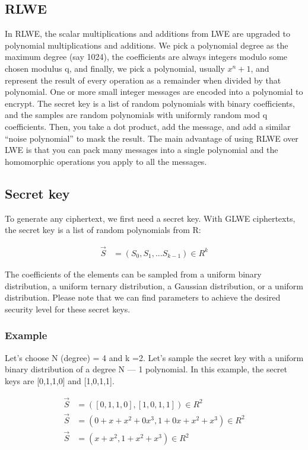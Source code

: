 \documentclass{techrep}
\theoremstyle{definition}
\theoremstyle{plain}
\begin{document}
\subsection{RLWE}
In RLWE, the scalar multiplications and additions from LWE are upgraded to polynomial multiplications and additions. We pick a polynomial degree as the maximum degree (say 1024), the coefficients are always integers modulo some chosen modulus q, and finally, we pick a polynomial, usually $x^n+1$, and represent the result of every operation as a remainder when divided by that polynomial. One or more small integer messages are encoded into a polynomial to encrypt. The secret key is a list of random polynomials with binary coefficients, and the samples are random polynomials with uniformly random mod q coefficients. Then, you take a dot product, add the message, and add a similar “noise polynomial” to mask the result. The main advantage of using RLWE over LWE is that you can pack many messages into a single polynomial and the homomorphic operations you apply to all the messages. 


	\subsection{Secret key}
To generate any ciphertext, we first need a secret key. With  GLWE ciphertexts, the secret key is a list of 
 random polynomials from R:

	\begin{align*}
		\overrightarrow{S} &= (S_0,S_1,...S_{k-1}) \in R^k
	\end{align*}

The coefficients of the elements can be sampled from a uniform binary distribution, a uniform ternary distribution, a Gaussian distribution, or a uniform distribution. Please note that we can find parameters to achieve the desired security level for these secret keys.

\subsubsection{Example}

Let’s choose N (degree) = 4 and k =2. Let's sample the secret key with a uniform binary distribution of a degree N — 1 polynomial. In this example, the secret keys are [0,1,1,0] and [1,0,1,1].

\begin{align*} 
\overrightarrow{S} &= ([0,1,1,0],[1,0,1,1]) \in R^2 \\ 
\overrightarrow{S} &= (0 + x + x^2 + 0x^3,1 + 0x + x^2 + x^3) \in R^2 \\ 
\overrightarrow{S} &= (x + x^2, 1 + x^2 + x^3) \in R^2 \\ 
\end{align*}
\end{document}
